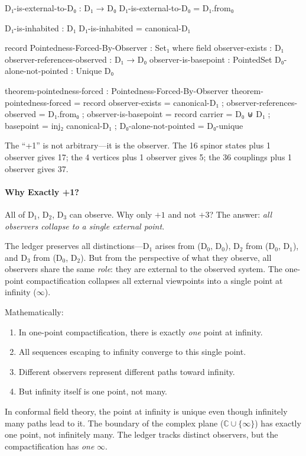 \documentclass[11pt,a4paper]{book}
\begin{document}
\begin{code}
D₁-is-external-to-D₀ : D₁ → D₀
D₁-is-external-to-D₀ = D₁.from₀

D₁-is-inhabited : D₁
D₁-is-inhabited = canonical-D₁

record Pointedness-Forced-By-Observer : Set₁ where
  field
    observer-exists : D₁
    observer-references-observed : D₁ → D₀
    observer-is-basepoint : PointedSet
    D₀-alone-not-pointed : Unique D₀

theorem-pointedness-forced : Pointedness-Forced-By-Observer
theorem-pointedness-forced = record
  { observer-exists = canonical-D₁
  ; observer-references-observed = D₁.from₀
  ; observer-is-basepoint = record 
      { carrier = D₀ ⊎ D₁
      ; basepoint = inj₂ canonical-D₁
      }
  ; D₀-alone-not-pointed = D₀-unique
  }
\end{code}

The ``+1'' is not arbitrary---it is the observer. The 16 spinor states plus 
1 observer gives 17; the 4 vertices plus 1 observer gives 5; the 36 couplings 
plus 1 observer gives 37.

\paragraph{Why Exactly +1?}
All of D$_1$, D$_2$, D$_3$ can observe. Why only $+1$ and not $+3$? The answer: 
\emph{all observers collapse to a single external point}.

The ledger preserves all distinctions---D$_1$ arises from (D$_0$, D$_0$), 
D$_2$ from (D$_0$, D$_1$), and D$_3$ from (D$_0$, D$_2$). But from the perspective 
of what they observe, all observers share the same \emph{role}: they are external 
to the observed system. The one-point compactification collapses all external 
viewpoints into a single point at infinity ($\infty$).

Mathematically:
\begin{enumerate}
\item In one-point compactification, there is exactly \emph{one} point at infinity.
\item All sequences escaping to infinity converge to this single point.
\item Different observers represent different paths toward infinity.
\item But infinity itself is one point, not many.
\end{enumerate}

In conformal field theory, the point at infinity is unique even though infinitely 
many paths lead to it. The boundary of the complex plane ($\mathbb{C} \cup \{\infty\}$) 
has exactly one point, not infinitely many. The ledger tracks distinct observers, 
but the compactification has \emph{one} $\infty$.
\end{document}

